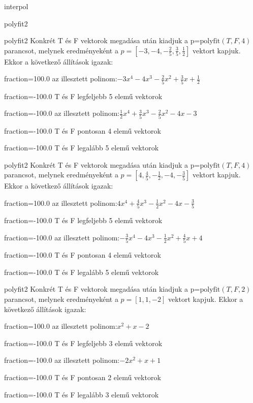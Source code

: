 \documentclass[12pt]{article}
\begin{document}
\begin{quiz}{interpol}
\begin{multi}[multiple]{polyfit2}
\end{multi}
\begin{multi}[multiple]{polyfit2}
Konkrét T és F vektorok megadása után kiadjuk a p=$\mathrm{polyfit}(T,F,4)$
parancsot, melynek eredményeként a $p=\left[-3,-4,-\frac{2}{5},\frac{3}{5},\frac{1}{2}\right]$ vektort kapjuk.
Ekkor a következő állítások igazak:
\item[fraction=100.0] az illesztett polinom:$-3x^4-4x^3-\frac{2}{5}x^2+\frac{3}{5}x+\frac{1}{2}$
\item[fraction=-100.0]  T és F legfeljebb 5 elemű vektorok
\item[fraction=-100.0]  az illesztett polinom:$\frac{1}{2}x^4+\frac{3}{5}x^3-\frac{2}{5}x^2-4x-3$
\item[fraction=-100.0]  T és F pontosan 4 elemű vektorok
\item[fraction=-100.0] T és F legalább 5 elemű vektorok
\end{multi}
\begin{multi}[multiple]{polyfit2}
Konkrét T és F vektorok megadása után kiadjuk a p=$\mathrm{polyfit}(T,F,4)$
parancsot, melynek eredményeként a $p=\left[4,\frac{4}{5},-\frac{1}{2},-4,-\frac{3}{5}\right]$ vektort kapjuk.
Ekkor a következő állítások igazak:
\item[fraction=100.0] az illesztett polinom:$4x^4+\frac{4}{5}x^3-\frac{1}{2}x^2-4x-\frac{3}{5}$
\item[fraction=-100.0]  T és F legfeljebb 5 elemű vektorok
\item[fraction=-100.0]  az illesztett polinom:$-\frac{3}{5}x^4-4x^3-\frac{1}{2}x^2+\frac{4}{5}x+4$
\item[fraction=-100.0]  T és F pontosan 4 elemű vektorok
\item[fraction=-100.0] T és F legalább 5 elemű vektorok
\end{multi}
\begin{multi}[multiple]{polyfit2}
Konkrét T és F vektorok megadása után kiadjuk a p=$\mathrm{polyfit}(T,F,2)$
parancsot, melynek eredményeként a $p=\left[1,1,-2\right]$ vektort kapjuk.
Ekkor a következő állítások igazak:
\item[fraction=100.0] az illesztett polinom:$x^2+x-2$
\item[fraction=-100.0]  T és F legfeljebb 3 elemű vektorok
\item[fraction=-100.0]  az illesztett polinom:$-2x^2+x+1$
\item[fraction=-100.0]  T és F pontosan 2 elemű vektorok
\item[fraction=-100.0] T és F legalább 3 elemű vektorok

\end{multi}
\end{quiz}
\end{document}
